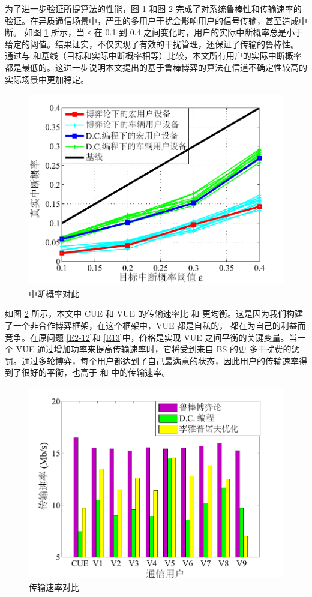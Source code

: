 为了进一步验证所提算法的性能，图 \ref{F4} 和图 \ref{F5} 完成了对系统鲁棒性和传输速率的验证。在异质通信场景中，严重的多用户干扰会影响用户的信号传输，甚至造成中断。
如图 \ref{F4} 所示，当 $\varepsilon$ 在 0.1 到 0.4 之间变化时，用户的实际中断概率总是小于给定的阈值。结果证实，不仅实现了有效的干扰管理，还保证了传输的鲁棒性。
通过与 \cite{PCID}和基线（目标和实际中断概率相等）比较，本文所有用户的实际中断概率都是最低的。这进一步说明本文提出的基于鲁棒博弈的算法在信道不确定性较高的实际场景中更加稳定。
\begin{figure}[H]
\centering
\includegraphics[width=12cm]{figures//chap2//4.pdf}
\caption{中断概率对此}
\label{F4}
\end{figure}

如图 \ref{F5} 所示，本文中 CUE 和 VUE 的传输速率比 \cite{PCID}和 \cite{ACAR}更均衡。这是因为我们构建了一个非合作博弈框架，在这个框架中，VUE 都是自私的，
都在为自己的利益而竞争。在原问题 \eqref{E2-12}和 \eqref{E13}中，价格是实现 VUE 之间平衡的关键变量。当一个 VUE 通过增加功率来提高传输速率时，它将受到来自 BS 的更
多干扰费的惩罚。通过多轮博弈，每个用户都达到了自己最满意的状态，因此用户的传输速率得到了很好的平衡，也高于 \cite{PCID}和 \cite{ACAR}中的传输速率。
\begin{figure}[H]
\centering
\includegraphics[width=12cm]{figures//chap2//5.pdf}
\caption{传输速率对比}
\label{F5}
\end{figure}

